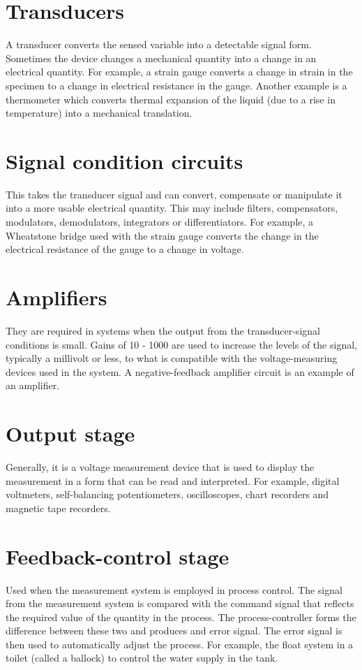 \section{Transducers}
A transducer converts the sensed variable into a detectable signal form. Sometimes the device changes a mechanical quantity into a change in an  electrical quantity. For example, a strain gauge converts a change in strain in the specimen to a change in electrical resistance in the gauge. Another example is a thermometer which converts thermal expansion of the liquid (due to a rise in temperature) into a mechanical translation.
\section{Signal condition circuits}
This takes the transducer signal and can convert, compensate or manipulate it into a more usable electrical quantity. This may include filters, compensators, modulators, demodulators, integrators or differentiators. For example, a Wheatstone bridge used with the strain gauge converts the change in the electrical resistance of the gauge to a change in voltage.
\section{Amplifiers}
They are required in systems when the output from the transducer-signal conditions is small. Gains of 10 - 1000 are used to increase the levels of the signal, typically a millivolt or less, to what is compatible with the voltage-measuring devices used in the system. A negative-feedback amplifier circuit is an example of an amplifier.
\section{Output stage}
Generally, it is a voltage measurement device that is used to display the measurement in a form that can be read and interpreted. For example, digital voltmeters, self-balancing potentiometers, oscilloscopes, chart recorders and magnetic tape recorders.
\section{Feedback-control stage}
Used when the measurement system is employed in process control. The signal from the measurement system is compared with the command signal that reflects the required value of the quantity in the process. The process-controller forms the difference between these two and produces and error signal. The error signal is then used to automatically adjust the process. For example, the float system in a toilet (called a ballock) to control the water supply in the tank.
